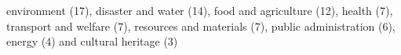 environment (17), disaster and water (14), food and agriculture (12), health (7), transport and welfare (7), resources and materials (7), public administration (6), energy (4) and cultural heritage (3)%
